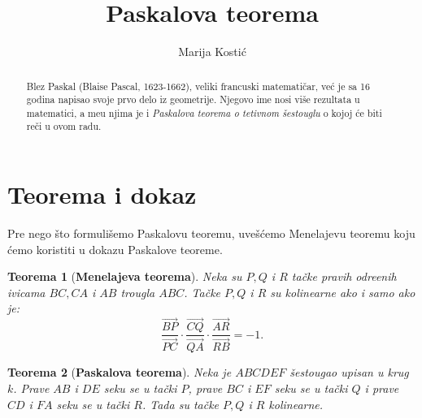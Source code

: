 \documentclass[a4paper,12pt]{article}
\title{\bf Paskalova teorema}
\author{Marija Kosti\'{c}}
\date{}
\newtheorem{teorema}{{Teorema}}
\theoremstyle{definition}
\begin{document}
\maketitle
\begin{abstract}
    Blez Paskal (Blaise Pascal, 1623-1662), veliki francuski matemati\v{c}ar, ve\'{c} je sa 16 godina napisao svoje prvo delo iz geometrije. Njegovo ime nosi vi\v{s}e rezultata u matematici, a me\dj{}u njima je i {\it Paskalova teorema o tetivnom \v{s}estouglu} o kojoj \'{c}e biti re\v{c}i u ovom radu.
\end{abstract}

\section*{Teorema i dokaz}

Pre nego \v{s}to formuli\v{s}emo Paskalovu teoremu, uve\v{s}\'{c}emo Menelajevu teoremu koju \'{c}emo koristiti u dokazu Paskalove teoreme.   

\begin{teorema}[\bf Menelajeva teorema]
\label{th:menelajeva}
Neka su $P,Q$ i $R$ ta\v{c}ke pravih odre\dj{}enih ivicama $BC, CA$ i $AB$ trougla $ABC$. Ta\v{c}ke $P,Q$ i $R$ su kolinearne ako i samo ako je:
\begin{equation*}
    \frac{\overrightarrow{BP}}{\overrightarrow{PC}}\cdot    \frac{\overrightarrow{CQ}}{\overrightarrow{QA}}\cdot    \frac{\overrightarrow{AR}}{\overrightarrow{RB}}=-1.
\end{equation*}


\end{teorema}

\begin{teorema}[\bf Paskalova teorema]
\label{th:paskalova}
Neka je $ABCDEF$ \v{s}estougao upisan u krug $k$. Prave $AB$ i $DE$ seku se u ta\v{c}ki $P$, prave $BC$ i $EF$ seku se u ta\v{c}ki $Q$ i prave $CD$ i $FA$ seku se u ta\v{c}ki $R$. Tada su ta\v{c}ke $P,Q$ i $R$ kolinearne.
\end{teorema}
\end{document}
